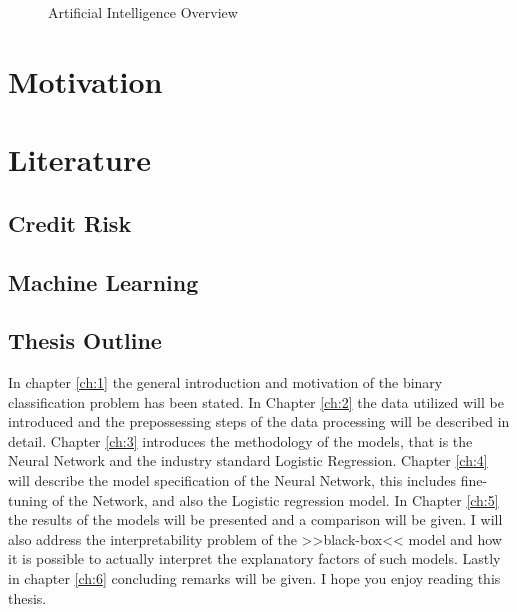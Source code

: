 \begin{figure}[H]
    \centering
    \caption{Artificial Intelligence Overview}
    \label{fig:AI_overview}
\end{figure}{}



\section{Motivation}

\section{Literature}

\subsection{Credit Risk}

\subsection{Machine Learning}

\subsection{Thesis Outline}
In chapter \ref{ch:1} the general introduction and motivation of the binary classification problem has been stated. In Chapter \ref{ch:2} the data utilized will be introduced and the prepossessing steps of the data processing will be described in detail. Chapter \ref{ch:3} introduces the methodology of the models, that is the Neural Network and the industry standard Logistic Regression. Chapter \ref{ch:4} will describe the model specification of the Neural Network, this includes fine-tuning of the Network, and also the Logistic regression model. In Chapter \ref{ch:5} the results of the models will be presented and a comparison will be given. I will also address the interpretability problem of the >>black-box<< model and how it is possible to actually interpret the explanatory factors of such models. Lastly in chapter \ref{ch:6} concluding remarks will be given. 
I hope you enjoy reading this thesis. 